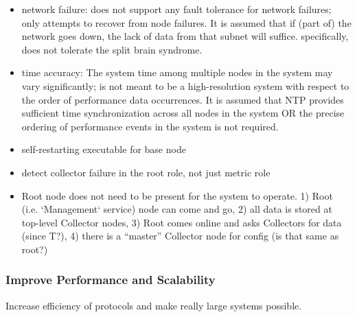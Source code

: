 \begin{itemize}

\item network failure: \dcamp does not support any fault tolerance for network failures; \dcamp only attempts to recover
from node failures. It is assumed that if (part of) the network goes down, the lack of data from that subnet will
suffice. specifically, \dcamp does not tolerate the split brain syndrome\cite{needed}.

\item time accuracy: The system time among multiple nodes in the system may vary significantly; \dcamp is not meant to
be a high-resolution system with respect to the order of performance data occurrences. It is assumed that NTP provides
sufficient time synchronization across all nodes in the system OR the precise ordering of performance events in the
system is not required.

\item self-restarting executable for base node

\item detect collector failure in the root role, not just metric role

\item Root node does not need to be present for the system to operate. 1) Root (i.e. `Management` service) node can come
and go, 2) all data is stored at top-level Collector nodes, 3) Root comes online and asks Collectors for data (since
T?), 4) there is a ``master'' Collector node for config (is that same as root?)

\end{itemize}

\subsubsection{Improve Performance and Scalability}

Increase efficiency of protocols and make really large \dcamp systems possible.

